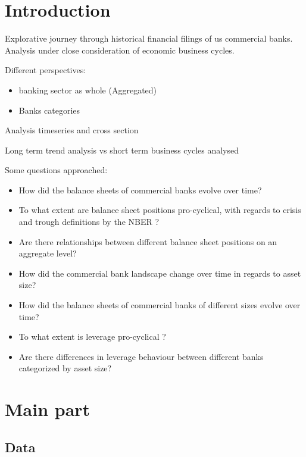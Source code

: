 \documentclass[12pt, a4paper]{article} %
\begin{document}
\tableofcontents
\newpage
{}




\section{Introduction}

Explorative journey through historical financial filings of us commercial banks.
Analysis under close consideration of economic business cycles.   

Different perspectives: 
\begin{itemize}
\item banking sector as whole (Aggregated)
\item Banks categories
\end{itemize}

Analysis timeseries and cross section

Long term trend analysis vs short term business cycles analysed

Some questions approached: 
\begin{itemize}
\item How did the balance sheets of commercial banks evolve over time?
\item To what extent are balance sheet positions pro-cyclical, with regards to crisis and trough definitions by the NBER ?
\item Are there relationships between different balance sheet positions on an aggregate level?
\item How did the commercial bank landscape change over time in regards to asset size?
\item How did the balance sheets of commercial banks of different sizes evolve over time?
\item To what extent is leverage pro-cyclical ?
\item Are there differences in leverage behaviour between different banks categorized by asset size?
\end{itemize}

\section{Main part}

\subsection{Data}
\label{sec:data}
\end{document}
